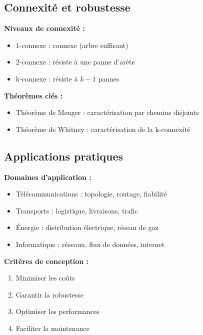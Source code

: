 \documentclass[12pt,a4paper]{article}
\begin{document}
\subsection{Connexité et robustesse}

\begin{astuce}
\textbf{Niveaux de connexité :}
\begin{itemize}
    \item \textcolor{defvert}{1-connexe} : connexe (arbre suffisant)
    \item \textcolor{titrebleu}{2-connexe} : résiste à une panne d'arête
    \item \textcolor{algoviolet}{k-connexe} : résiste à $k-1$ pannes
\end{itemize}

\textbf{Théorèmes clés :}
\begin{itemize}
    \item Théorème de Menger : caractérisation par chemins disjoints
    \item Théorème de Whitney : caractérisation de la k-connexité
\end{itemize}
\end{astuce}

\subsection{Applications pratiques}

\begin{notecours}
\textbf{Domaines d'application :}
\begin{itemize}
    \item \textcolor{titrebleu}{Télécommunications} : topologie, routage, fiabilité
    \item \textcolor{defvert}{Transports} : logistique, livraisons, trafic
    \item \textcolor{algoviolet}{Énergie} : distribution électrique, réseau de gaz
    \item \textcolor{exempleorange}{Informatique} : réseaux, flux de données, internet
\end{itemize}

\textbf{Critères de conception :}
\begin{enumerate}
    \item Minimiser les coûts
    \item Garantir la robustesse
    \item Optimiser les performances
    \item Faciliter la maintenance
\end{enumerate}
\end{notecours}
\end{document}
